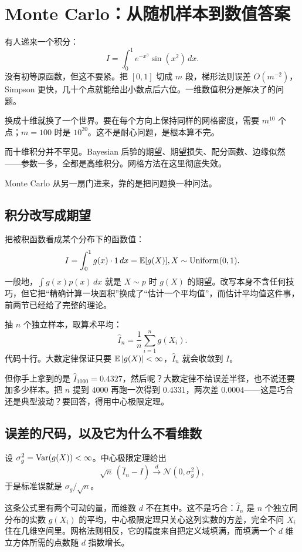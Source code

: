 \section{Monte Carlo：从随机样本到数值答案}
\label{sec:05-Probability/08-Limit-Theorems/05}

有人递来一个积分：
\[
I=\int_0^1 e^{-x^3}\sin(x^2)\,dx .
\]
没有初等原函数，但这不要紧。把 \([0,1]\) 切成 \(m\) 段，梯形法则误差 \(O(m^{-2})\)，Simpson 更快，几十个点就能给出小数点后六位。一维数值积分是解决了的问题。

换成十维就换了一个世界。要在每个方向上保持同样的网格密度，需要 \(m^{10}\) 个点；\(m=100\) 时是 \(10^{20}\)。这不是耐心问题，是根本算不完。

而十维积分并不罕见。Bayesian 后验的期望、期望损失、配分函数、边缘似然——参数一多，全都是高维积分。网格方法在这里彻底失效。

Monte Carlo 从另一扇门进来，靠的是把问题换一种问法。

\subsection{积分改写成期望}

把被积函数看成某个分布下的函数值：
\[
I=\int_0^1 g(x)\cdot1\,dx=\mathbb{E}[g(X)],\space X\sim\operatorname{Uniform}(0,1).
\]
一般地，\(\int g(x)p(x)\,dx\) 就是 \(X\sim p\) 时 \(g(X)\) 的期望。改写本身不含任何技巧，但它把``精确计算一块面积''换成了``估计一个平均值''，而估计平均值这件事，前两节已经给了完整的理论。

抽 \(n\) 个独立样本，取算术平均：
\[
\widehat I_n=\frac1n\sum_{i=1}^n g(X_i).
\]
代码十行。大数定律保证只要 \(\mathbb{E}\left|g(X)\right|<\infty\)，\(\widehat I_n\) 就会收敛到 \(I\)。

但你手上拿到的是 \(\widehat I_{1000}=0.4327\)，然后呢？大数定律不给误差半径，也不说还要加多少样本。把 \(n\) 提到 \(4000\) 再跑一次得到 \(0.4331\)，两次差 \(0.0004\)——这是巧合还是典型波动？要回答，得用中心极限定理。

\subsection{误差的尺码，以及它为什么不看维数}

设 \(\sigma_g^2=\operatorname{Var}(g(X))<\infty\)。中心极限定理给出
\[
\sqrt n\,(\widehat I_n-I)\xrightarrow{d}\mathcal N(0,\sigma_g^2),
\]
于是标准误就是 \(\sigma_g/\sqrt n\)。

这条公式里有两个可动的量，而维数 \(d\) 不在其中。这不是巧合：\(\widehat I_n\) 是 \(n\) 个独立同分布的实数 \(g(X_i)\) 的平均，中心极限定理只关心这列实数的方差，完全不问 \(X_i\) 住在几维空间里。网格法则相反，它的精度来自把定义域填满，而填满一个 \(d\) 维立方体所需的点数随 \(d\) 指数增长。

